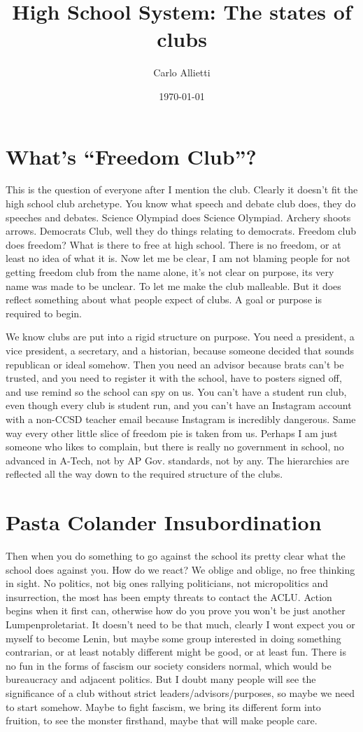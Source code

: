 \documentclass{article}
\title{High School System: The states of clubs}
\author{Carlo Allietti}
\date{\today}
\begin{document}
\maketitle
\section{What's ``Freedom Club''?}
This is the question of everyone after I mention the club. Clearly it doesn't fit the high school club archetype. You know what speech and debate club does, they do speeches and debates. Science Olympiad does Science Olympiad. Archery shoots arrows. Democrats Club, well they do things relating to democrats. Freedom club does freedom? What is there to free at high school. There is no freedom, or at least no idea of what it is. Now let me be clear, I am not blaming people for not getting freedom club from the name alone, it's not clear on purpose, its very name was made to be unclear. To let me make the club malleable. But it does reflect something about what people expect of clubs. A goal or purpose is required to begin.

We know clubs are put into a rigid structure on purpose. You need a president, a vice president, a secretary, and a historian, because someone decided that sounds republican or ideal somehow. Then you need an advisor because brats can't be trusted, and you need to register it with the school, have to posters signed off, and use remind so the school can spy on us. You can't have a student run club, even though every club is student run, and you can't have an Instagram account with a non-CCSD teacher email because Instagram is incredibly dangerous. Same way every other little slice of freedom pie is taken from us. Perhaps I am just someone who likes to complain, but there is really no government in school, no advanced in A-Tech, not by AP Gov. standards, not by any. The hierarchies are reflected all the way down to the required structure of the clubs.
\section{Pasta Colander Insubordination}
Then when you do something to go against the school its pretty clear what the school does against you. How do we react? We oblige and oblige, no free thinking in sight. No politics, not big ones rallying politicians, not micropolitics and insurrection, the most has been empty threats to contact the ACLU. Action begins when it first can, otherwise how do you prove you won't be just another Lumpenproletariat. It doesn't need to be that much, clearly I wont expect you or myself to become Lenin, but maybe some group interested in doing something contrarian, or at least notably different might be good, or at least fun. There is no fun in the forms of fascism our society considers normal, which would be bureaucracy and adjacent politics. But I doubt many people will see the significance of a club without strict leaders/advisors/purposes, so maybe we need to start somehow. Maybe to fight fascism, we bring its different form into fruition, to see the monster firsthand, maybe that will make people care.
\end{document}
